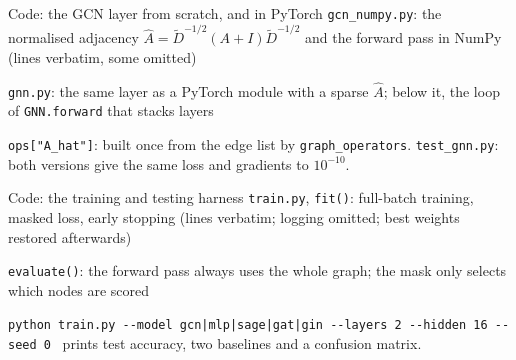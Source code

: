 \documentclass[aspectratio=169,10pt]{beamer}
\newcommand{\Ah}{\hat A}
\newcommand{\Dt}{\tilde D}
\begin{document}
\begin{frame}[fragile]{Code: the GCN layer from scratch, and in PyTorch}
\vspace{-1mm}
{\footnotesize \texttt{gcn\_numpy.py}: the normalised adjacency $\Ah=\Dt^{-1/2}(A+I)\Dt^{-1/2}$ and the forward pass in NumPy (lines verbatim, some omitted)}

\vspace{0.5mm}
{\footnotesize \texttt{gnn.py}: the same layer as a PyTorch module with a sparse $\Ah$; below it, the loop of \texttt{GNN.forward} that stacks layers}

\vspace{-0.5mm}
{\scriptsize\color{cTok}\texttt{ops["A\_hat"]}: built once from the edge list by \texttt{graph\_operators}. \texttt{test\_gnn.py}: both versions give the same loss and gradients to $10^{-10}$.}
\end{frame}

\begin{frame}[fragile]{Code: the training and testing harness}
\vspace{-1mm}
{\footnotesize \texttt{train.py}, \texttt{fit()}: full-batch training, masked loss, early stopping (lines verbatim; logging omitted; best weights restored afterwards)}

\vspace{0.5mm}
{\footnotesize \texttt{evaluate()}: the forward pass always uses the whole graph; the mask only selects which nodes are scored}

\vspace{-0.5mm}
{\scriptsize\color{cTok}\texttt{python train.py -{}-model gcn|mlp|sage|gat|gin -{}-layers 2 -{}-hidden 16 -{}-seed 0} \ prints test accuracy, two baselines and a confusion matrix.}
\end{frame}
\end{document}
